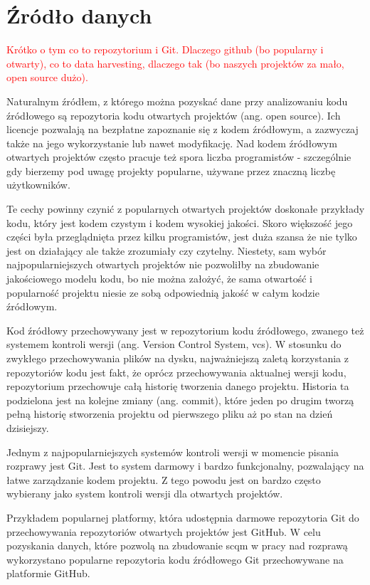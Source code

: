 \documentclass[12pt]{report}
\begin{document}
\section{Źródło danych}
\textcolor{red}{Krótko o tym co to repozytorium i Git. Dlaczego github (bo popularny i otwarty), co to data harvesting, dlaczego tak (bo naszych projektów za mało, open source dużo).}

Naturalnym źródłem, z którego można pozyskać dane przy analizowaniu kodu źródłowego są repozytoria kodu otwartych projektów (ang. open source). Ich licencje pozwalają na bezpłatne zapoznanie się z kodem źródłowym, a zazwyczaj także na jego wykorzystanie lub nawet modyfikację. Nad kodem źródłowym otwartych projektów często pracuje też spora liczba programistów - szczególnie gdy bierzemy pod uwagę projekty popularne, używane przez znaczną liczbę użytkowników.

Te cechy powinny czynić z popularnych otwartych projektów doskonałe przykłady kodu, który jest kodem czystym i kodem wysokiej jakości. Skoro większość jego części była przeglądnięta przez kilku programistów, jest duża szansa że nie tylko jest on działający ale także zrozumiały czy czytelny. Niestety, sam wybór najpopularniejszych otwartych projektów nie pozwoliłby na zbudowanie jakościowego modelu kodu, bo nie można założyć, że sama otwartość i popularność projektu niesie ze sobą odpowiednią jakość w całym kodzie źródłowym.

Kod źródłowy przechowywany jest w repozytorium kodu źródłowego, zwanego też systemem kontroli wersji (ang. Version Control System, \gls{vcs}). W stosunku do zwykłego przechowywania plików na dysku, najważniejszą zaletą korzystania z repozytoriów kodu jest fakt, że oprócz przechowywania aktualnej wersji kodu, repozytorium przechowuje całą historię tworzenia danego projektu. Historia ta podzielona jest na kolejne zmiany (ang. commit), które jeden po drugim tworzą pełną historię stworzenia projektu od pierwszego pliku aż po stan na dzień dzisiejszy.

Jednym z najpopularniejszych systemów kontroli wersji w momencie pisania rozprawy jest Git. Jest to system darmowy i bardzo funkcjonalny, pozwalający na łatwe zarządzanie kodem projektu. Z tego powodu jest on bardzo często wybierany jako system kontroli wersji dla otwartych projektów.

Przykładem popularnej platformy, która udostępnia darmowe repozytoria Git do przechowywania repozytoriów otwartych projektów jest GitHub. W celu pozyskania danych, które pozwolą na zbudowanie \gls{scqm} w pracy nad rozprawą wykorzystano popularne repozytoria kodu źródłowego Git przechowywane na platformie GitHub.
\end{document}
